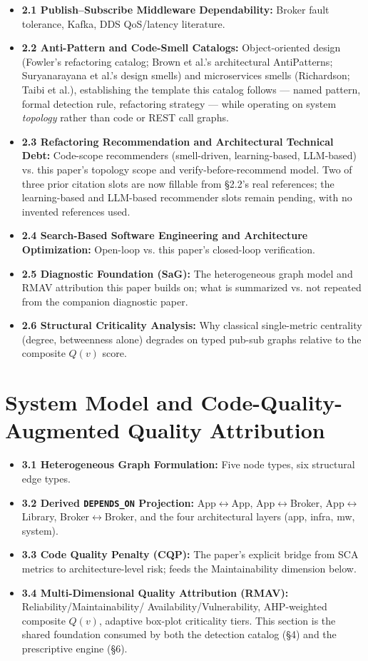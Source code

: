 \documentclass[11pt]{article}
\begin{document}
\begin{itemize}[leftmargin=*]
\item \textbf{2.1 Publish--Subscribe Middleware Dependability:} Broker fault tolerance, Kafka, DDS
  QoS/latency literature.
\item \textbf{2.2 Anti-Pattern and Code-Smell Catalogs:} Object-oriented design (Fowler's refactoring
  catalog; Brown et al.'s architectural AntiPatterns; Suryanarayana et al.'s design smells) and
  microservices smells (Richardson; Taibi et al.), establishing the template this catalog follows ---
  named pattern, formal detection rule, refactoring strategy --- while operating on system
  \emph{topology} rather than code or REST call graphs.
\item \textbf{2.3 Refactoring Recommendation and Architectural Technical Debt:} Code-scope
  recommenders (smell-driven, learning-based, LLM-based) vs. this paper's topology scope and
  verify-before-recommend model. Two of three prior citation slots are now fillable from \S2.2's real
  references; the learning-based and LLM-based recommender slots remain pending, with no invented
  references used.
\item \textbf{2.4 Search-Based Software Engineering and Architecture Optimization:} Open-loop vs.
  this paper's closed-loop verification.
\item \textbf{2.5 Diagnostic Foundation (SaG):} The heterogeneous graph model and RMAV attribution
  this paper builds on; what is summarized vs. not repeated from the companion diagnostic paper.
\item \textbf{2.6 Structural Criticality Analysis:} Why classical single-metric centrality (degree,
  betweenness alone) degrades on typed pub-sub graphs relative to the composite $Q(v)$ score.
\end{itemize}

\section{System Model and Code-Quality-Augmented Quality Attribution}

\begin{itemize}[leftmargin=*]
\item \textbf{3.1 Heterogeneous Graph Formulation:} Five node types, six structural edge types.
\item \textbf{3.2 Derived \texttt{DEPENDS\_ON} Projection:} App$\leftrightarrow$App,
  App$\leftrightarrow$Broker, App$\leftrightarrow$Library, Broker$\leftrightarrow$Broker, and the four
  architectural layers (app, infra, mw, system).
\item \textbf{3.3 Code Quality Penalty (CQP):} The paper's explicit bridge from SCA metrics to
  architecture-level risk; feeds the Maintainability dimension below.
\item \textbf{3.4 Multi-Dimensional Quality Attribution (RMAV):} Reliability/Maintainability/
  Availability/Vulnerability, AHP-weighted composite $Q(v)$, adaptive box-plot criticality tiers. This
  section is the shared foundation consumed by both the detection catalog (\S4) and the prescriptive
  engine (\S6).
\end{itemize}
\end{document}
